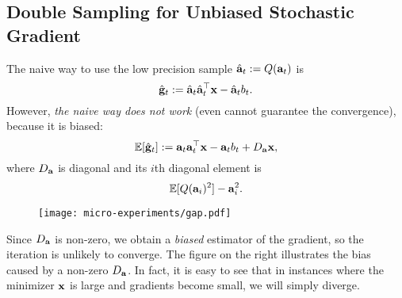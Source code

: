 \subsection{Double Sampling for Unbiased Stochastic Gradient}
\vspace{-0.5em}
The naive way to use the low precision sample $\hat{{\bf a}}_t := Q({\bf a}_t)$ is 
\[
\hat{{\bf g}}_t := \hat{{\bf a}}_t \hat{{\bf a}}_t^\top {\bf x} - \hat{{\bf a}}_t b_t.
\]
However, \emph{the naive way does not work} (even cannot guarantee the convergence), because it is biased: 
\[
\mathbb{E}[\hat{{\bf g}}_t] := {\bf a}_t {\bf a}_t^\top {\bf x} - {\bf a}_t b_t + D_{{\bf a}} {\bf x}, 
\]
where $D_{{\bf a}}$ is diagonal and its $i$th diagonal element is 
\[
\mathbb{E}[ Q({\bf a}_i)^2 ] - {\bf a}_i^2.
\]
%

\begin{wrapfigure}{r}{0.23\textwidth}
  \begin{center}
    \texttt{[image: micro-experiments/gap.pdf]}
  \end{center}
  \label{fig:gap}
\end{wrapfigure}

\vspace{-0.5em}
Since $D_{{\bf a}}$ is non-zero, we obtain a \emph{biased} estimator of the gradient, so the iteration is unlikely to converge. 
The figure on the right illustrates the bias caused by a non-zero $D_{{\bf a}}$. In fact, it is easy to see that in instances where the minimizer ${\bf x}$ is large and gradients become small, we will simply diverge. 

